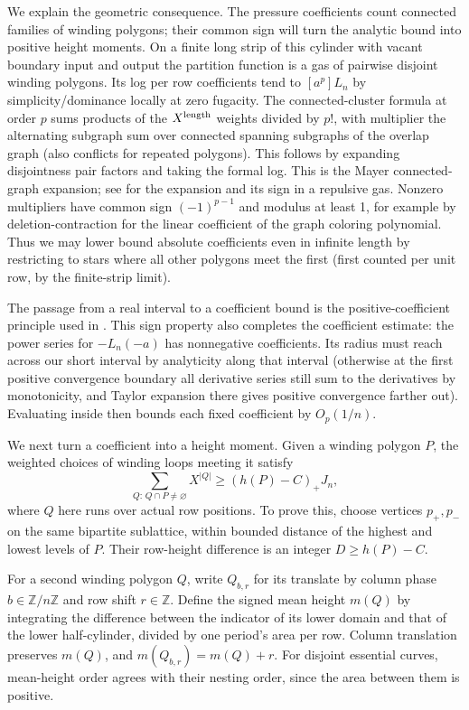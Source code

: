 We explain the geometric consequence. The pressure coefficients count connected families of winding polygons; their common sign will turn the analytic bound into positive height moments. On a finite long strip of this cylinder with vacant boundary input and output the partition function is a gas of pairwise disjoint winding polygons. Its log per row coefficients tend to \([a^p]L_n\) by simplicity/dominance locally at zero fugacity. The connected-cluster formula at order \(p\) sums products of the \(X^{\rm length}\) weights divided by \(p!\), with multiplier the alternating subgraph sum over connected spanning subgraphs of the overlap graph (also conflicts for repeated polygons). This follows by expanding disjointness pair factors and taking the formal log. This is the Mayer connected-graph expansion; see \cite[Propositions~2.1, 2.6 and~2.8]{ScottSokal2005} for the expansion and its sign in a repulsive gas. Nonzero multipliers have common sign \((-1)^{p-1}\) and modulus at least 1, for example by deletion-contraction for the linear coefficient of the graph coloring polynomial. Thus we may lower bound absolute coefficients even in infinite length by restricting to stars where all other polygons meet the first (first counted per unit row, by the finite-strip limit).

The passage from a real interval to a coefficient bound is the positive-coefficient principle used in \cite[Section~2.3]{ScottSokal2005}. This sign property also completes the coefficient estimate: the power series for \(-L_n(-a)\) has nonnegative coefficients. Its radius must reach across our short interval by analyticity along that interval (otherwise at the first positive convergence boundary all derivative series still sum to the derivatives by monotonicity, and Taylor expansion there gives positive convergence farther out). Evaluating inside then bounds each fixed coefficient by \(O_p(1/n)\).

We next turn a coefficient into a height moment. Given a winding
polygon $P$, the weighted choices of winding loops meeting it satisfy
\begin{equation}\label{L:eq:winding-overlap}
 \sum_{Q:\,Q\cap P\ne\varnothing}X^{|Q|}
       \ge (h(P)-C)_+J_n,
\end{equation}
where $Q$ here runs over actual row positions. To prove this, choose
vertices $p_+,p_-$ on the same bipartite sublattice, within bounded
distance of the highest and lowest levels of $P$. Their row-height
difference is an integer $D\ge h(P)-C$.

For a second winding polygon $Q$, write $Q_{b,r}$ for its translate by
column phase $b\in\mathbb Z/n\mathbb Z$ and row shift $r\in\mathbb Z$.
Define the signed mean height $m(Q)$ by integrating the difference
between the indicator of its lower domain and that of the lower
half-cylinder, divided by one period's area per row. Column translation
preserves $m(Q)$, and $m(Q_{b,r})=m(Q)+r$. For disjoint essential curves,
mean-height order agrees with their nesting order, since the area
between them is positive.

